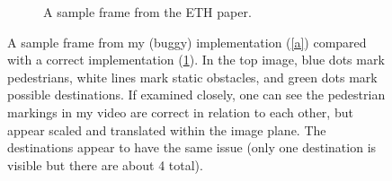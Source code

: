 \documentclass[a4paper,11pt,headings=small]{article}
\begin{document}
\begin{figure}[h]
\begin{subfigure}[b]{0.8\textwidth}
\caption{A sample frame from the ETH paper.\cite{Pellegrini2009}}
\label{b}
\end{subfigure}
\caption{A sample frame from my (buggy) implementation (\ref{a}) compared with a correct implementation (\ref{b}). In the top image, blue dots mark pedestrians, white lines mark static obstacles, and green dots mark possible destinations. If examined closely, one can see the pedestrian markings in my video are correct in relation to each other, but appear scaled and translated within the image plane. The destinations appear to have the same issue (only one destination is visible but there are about 4 total).}
\label{bug}
\end{figure}




\end{document}
